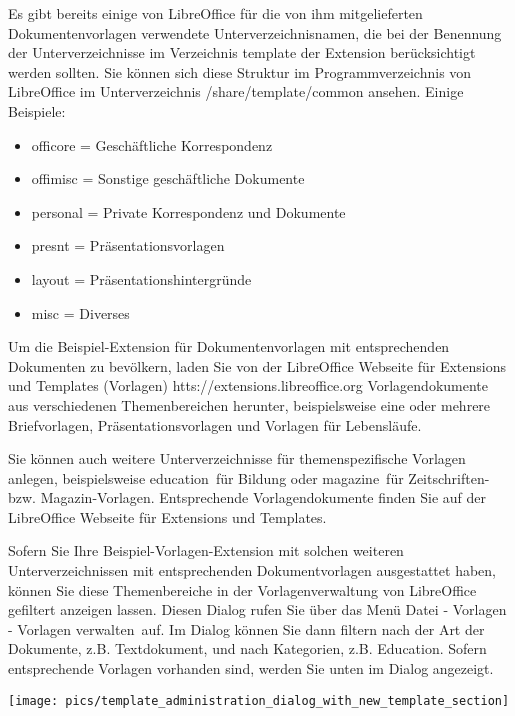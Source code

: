 \documentclass[a4paper,10pt,pagesize,titlepage]{scrbook}
\begin{document}
Es gibt bereits einige von LibreOffice für die von ihm mitgelieferten Dokumentenvorlagen verwendete Unterverzeichnisnamen, die bei der Benennung der Unterverzeichnisse im Verzeichnis template der Extension berücksichtigt werden sollten. Sie können sich diese Struktur im Programmverzeichnis von LibreOffice im Unterverzeichnis /share/template/common ansehen. Einige Beispiele:
\begin{itemize}
	\item officore = Geschäftliche Korrespondenz
	\item offimisc = Sonstige geschäftliche Dokumente
	\item personal = Private Korrespondenz und Dokumente
	\item presnt = Präsentationsvorlagen
	\item layout = Präsentationshintergründe
	\item misc = Diverses
\end{itemize}

Um die Beispiel-Extension für Dokumentenvorlagen mit entsprechenden Dokumenten zu bevölkern, laden Sie von der LibreOffice Webseite für Extensions und Templates (Vorlagen) htts://extensions.libreoffice.org Vorlagendokumente aus verschiedenen Themenbereichen herunter, beispielsweise eine oder mehrere Briefvorlagen, Präsentationsvorlagen und Vorlagen für Lebensläufe.

Sie können auch weitere Unterverzeichnisse für themenspezifische Vorlagen anlegen, beispielsweise \glqq education\grqq~für Bildung oder \glqq magazine\grqq~für Zeitschriften- bzw. Magazin-Vorlagen. Entsprechende Vorlagendokumente finden Sie auf der LibreOffice Webseite für Extensions und Templates.

Sofern Sie Ihre Beispiel-Vorlagen-Extension mit solchen weiteren Unterverzeichnissen mit entsprechenden Dokumentvorlagen ausgestattet haben, können Sie diese Themenbereiche in der Vorlagenverwaltung von LibreOffice gefiltert anzeigen lassen. Diesen Dialog rufen Sie über das Menü \glqq Datei - Vorlagen - Vorlagen verwalten\grqq~auf. Im Dialog können Sie dann filtern nach der Art der Dokumente, z.B. Textdokument, und nach Kategorien, z.B. Education. Sofern entsprechende Vorlagen vorhanden sind, werden Sie unten im Dialog angezeigt.

\begin{center}
	\captionsetup{type=figure}
	\texttt{[image: pics/template\_administration\_dialog\_with\_new\_template\_section]}
	\label{fig:template_administration_dialog_with_new_template_section}
\end{center}
\end{document}
